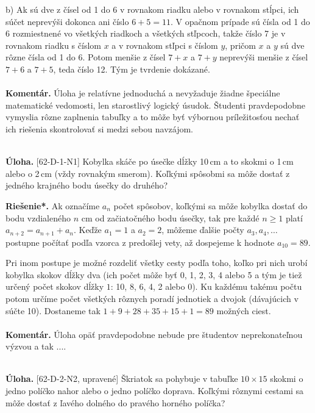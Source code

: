 \documentclass[11pt,a4paper,oneside,final]{book}
\newcommand{\kom}{\textbf{Komentár.} }
\newcommand{\ul}{\textbf{Úloha.} }
\newcommand{\rieh}{\textbf{Riešenie*.} }
\begin{document}
b) Ak sú dve z čísel od 1 do 6 v rovnakom riadku alebo v rovnakom stĺpci, ich súčet neprevýši dokonca ani číslo $6 + 5 = 11$. V opačnom prípade sú čísla od 1 do 6 rozmiestnené vo všetkých riadkoch a všetkých stľpcoch, takže číslo 7 je v rovnakom riadku s číslom $x$ a v rovnakom stľpci s číslom $y$, pričom $x$ a $y$ sú dve rôzne čísla od 1 do 6. Potom menšie z čísel $7 + x$ a $7 + y$ neprevýši menšie z čísel $7 + 6$ a $7 + 5$, teda číslo 12. Tým je tvrdenie dokázané.\\
\\
\kom Úloha je relatívne jednoduchá a nevyžaduje žiadne špeciálne matematické vedomosti, len starostlivý logický úsudok. Študenti pravdepodobne vymyslia rôzne zaplnenia tabuľky a to môže byť výbornou príležitosťou nechať ich riešenia skontrolovať si medzi sebou navzájom. \\
\\
\begin{tcolorbox}[breakable,notitle,boxrule=0pt,colback=light-gray,colframe=light-gray]\ul [62-D-1-N1]
Kobylka skáče po úsečke dĺžky 10\,cm a to skokmi o 1\,cm alebo o 2\,cm (vždy rovnakým smerom). Koľkými spôsobmi sa môže dostať z jedného krajného bodu úsečky do druhého?

\end{tcolorbox}

\rieh Ak označíme $a_n$ počet spôsobov, koľkými sa môže kobylka dostať do bodu vzdialeného $n$ cm od začiatočného bodu úsečky, tak pre každé $n \geq 1$ platí $a_{n+2}= a_{n+1} + a_n$. Keďže $a_1 = 1$ a $a_2 = 2$, môžeme ďalšie počty $a_3, a_4,\ldots$ postupne počítať podľa vzorca z predošlej vety, až dospejeme k hodnote $a_{10} = 89$.

Pri inom postupe je možné rozdeliť všetky cesty podľa toho, koľko pri nich urobí kobylka skokov dĺžky dva (ich počet môže byť 0, 1, 2, 3, 4 alebo 5 a tým je tiež určený počet skokov dĺžky $1$: 10, 8, 6, 4, 2 alebo 0). Ku každému takému počtu potom určíme počet všetkých rôznych poradí jednotiek a dvojok (dávajúcich v súčte 10). Dostaneme tak $1+9+28+ 35 + 15 + 1 = 89$ možných ciest.\\
\\
\kom Úloha opäť pravdepodobne nebude pre študentov neprekonateľnou výzvou a tak ....\\
\\
\begin{tcolorbox}[breakable,notitle,boxrule=0pt,colback=light-gray,colframe=light-gray]\ul [62-D-2-N2, upravené] Škriatok sa pohybuje v tabuľke $10 \times 15$ skokmi o jedno políčko nahor alebo o jedno políčko doprava. Koľkými rôznymi cestami sa môže dostať z ľavého dolného do pravého horného políčka?\

\end{tcolorbox}
\end{document}

